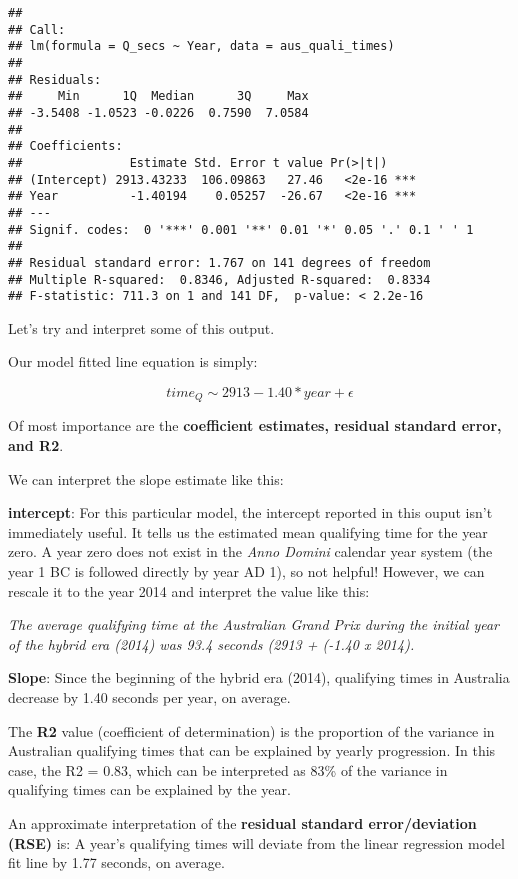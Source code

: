 \documentclass[
]{book}
\begin{document}
\begin{verbatim}
## 
## Call:
## lm(formula = Q_secs ~ Year, data = aus_quali_times)
## 
## Residuals:
##     Min      1Q  Median      3Q     Max 
## -3.5408 -1.0523 -0.0226  0.7590  7.0584 
## 
## Coefficients:
##               Estimate Std. Error t value Pr(>|t|)    
## (Intercept) 2913.43233  106.09863   27.46   <2e-16 ***
## Year          -1.40194    0.05257  -26.67   <2e-16 ***
## ---
## Signif. codes:  0 '***' 0.001 '**' 0.01 '*' 0.05 '.' 0.1 ' ' 1
## 
## Residual standard error: 1.767 on 141 degrees of freedom
## Multiple R-squared:  0.8346, Adjusted R-squared:  0.8334 
## F-statistic: 711.3 on 1 and 141 DF,  p-value: < 2.2e-16
\end{verbatim}

Let's try and interpret some of this output.

Our model fitted line equation is simply:

\[ time_Q \sim 2913 - 1.40 * year + \epsilon\]

Of most importance are the \textbf{coefficient estimates, residual standard error, and R2}.

We can interpret the slope estimate like this:

\textbf{intercept}: For this particular model, the intercept reported in this ouput isn't immediately useful. It tells us the estimated mean qualifying time for the year zero. A year zero does not exist in the \emph{Anno Domini} calendar year system (the year 1 BC is followed directly by year AD 1), so not helpful! However, we can rescale it to the year 2014 and interpret the value like this:

\emph{The average qualifying time at the Australian Grand Prix during the initial year of the hybrid era (2014) was 93.4 seconds (2913 + (-1.40 x 2014).}

\textbf{Slope}: Since the beginning of the hybrid era (2014), qualifying times in Australia decrease by 1.40 seconds per year, on average.

The \textbf{R2} value (coefficient of determination) is the proportion of the variance in Australian qualifying times that can be explained by yearly progression. In this case, the R2 = 0.83, which can be interpreted as 83\% of the variance in qualifying times can be explained by the year.

An approximate interpretation of the \textbf{residual standard error/deviation (RSE)} is: A year's qualifying times will deviate from the linear regression model fit line by 1.77 seconds, on average.
\end{document}
